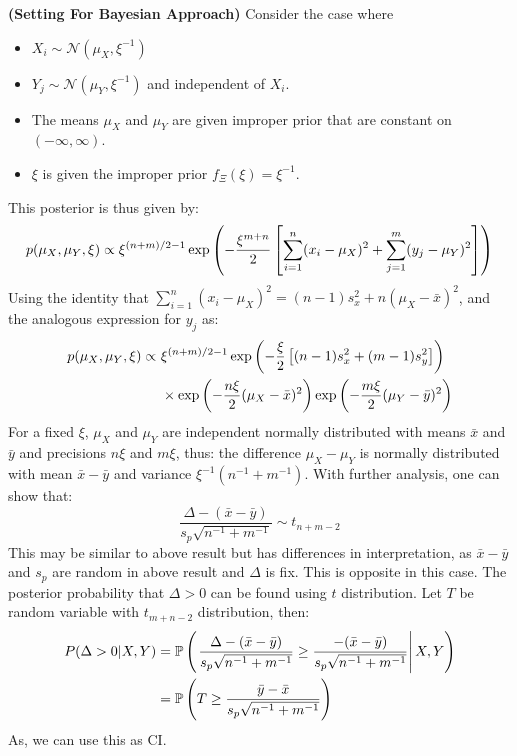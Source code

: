 \begin{remark}{\textbf{(Setting For Bayesian Approach)}}
    Consider the case where 
    \begin{itemize}
        \item $X_i \sim \mathcal{N}(\mu_X, \xi^{-1})$
        \item $Y_j \sim \mathcal{N}(\mu_Y, \xi^{-1})$ and independent of $X_i$. 
        \item The means $\mu_X$ and $\mu_Y$ are given improper prior that are constant on $(-\infty, \infty)$.
        \item $\xi$ is given the improper prior $f_{\Xi}(\xi) = \xi^{-1}$.
    \end{itemize}
    This posterior is thus given by:
    \begin{equation*}
        p(\mu_X, \mu_Y, \xi) \propto \xi^{(n+m)/2 - 1}\exp\left( -\frac{\xi^{m+n}}{2}\left[ \sum^n_{i=1}(x_i - \mu_X)^2 + \sum^m_{j=1}(y_j - \mu_Y)^2 \right] \right)
    \end{equation*}
    Using the identity that $\sum^n_{i=1}(x_i-\mu_X)^2 = (n-1)s_x^2 + n(\mu_X - \bar{x})^2$, and the analogous expression for $y_j$ as:
    \begin{equation*}
    \begin{aligned}
        p(\mu_X, \mu_Y, \xi) \propto \  &\xi^{(n+m)/2-1}\exp\left( -\frac{\xi}{2}\left[ (n-1)s_x^2 + (m-1)s^2_y \right] \right) \\
        &\times \exp\left( -\frac{n\xi}{2}(\mu_X - \bar{x})^2 \right)\exp\left( -\frac{m\xi}{2}(\mu_Y - \bar{y})^2 \right)
    \end{aligned}
    \end{equation*}
    For a fixed $\xi$, $\mu_X$ and $\mu_Y$ are independent normally distributed with means $\bar{x}$ and $\bar{y}$ and precisions $n\xi$ and $m\xi$, thus: the difference $\mu_X - \mu_Y$ is normally distributed with mean $\bar{x}-\bar{y}$ and variance $\xi^{-1}(n^{-1} + m^{-1})$. With further analysis, one can show that:
    \begin{equation*}
        \frac{\Delta-(\bar{x} -\bar{y})}{s_p\sqrt{n^{-1} + m^{-1}}} \sim t_{n+m-2}
    \end{equation*}
    This may be similar to above result but has differences in interpretation, as $\bar{x}-\bar{y}$ and $s_p$ are random in above result and $\Delta$ is fix. This is opposite in this case. The posterior probability that $\Delta>0$ can be found using $t$ distribution. Let $T$ be random variable with $t_{m+n-2}$ distribution, then:
    \begin{equation*}
    \begin{aligned}
        P(\Delta > 0 | X, Y) &= \mathbb{P}\left( \left.\frac{\Delta - (\bar{x} -\bar{y})}{s_p\sqrt{n^{-1} + m^{-1}}} \ge \frac{-(\bar{x} - \bar{y})}{s_p\sqrt{n^{-1} + m^{-1}}} \right| X, Y  \right) \\
        &= \mathbb{P}\left( T \ge \frac{\bar{y} - \bar{x}}{s_p\sqrt{n^{-1} + m^{-1}}} \right)
    \end{aligned}
    \end{equation*}
    As, we can use this as CI. 
\end{remark}

